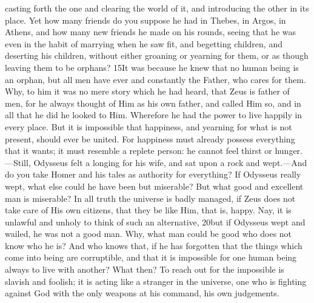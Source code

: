 casting forth the one and clearing the world of it, and introducing the other in its place. Yet how many friends do you suppose he had in Thebes, in Argos, in Athens, and how many new friends he made on his rounds, seeing that he was even in the habit of marrying when he saw fit, and begetting children, and deserting his children, without either groaning or yearning for them, or as though leaving them to be orphans? 15It was because he knew that no human being is an orphan, but all men have ever and constantly the Father, who cares for them. Why, to him it was no mere story which he had heard, that Zeus is father of men, for he always thought of Him as his own father, and called Him so, and in all that he did he looked to Him. Wherefore he had the power to live happily in every place. But it is impossible that happiness, and yearning for what is not present, should ever be united. For happiness must already possess everything that it wants; it must resemble a replete person: he cannot feel thirst or hunger.—Still, Odysseus felt a longing for his wife, and sat upon a rock and wept.—And do you take Homer and his tales as authority for everything? If Odysseus really wept, what else could he have been but miserable? But what good and excellent man is miserable? In all truth the universe is badly managed, if Zeus does not take care of His own citizens, that they be like Him, that is, happy. Nay, it is unlawful and unholy to think of such an alternative, 20but if Odysseus wept and wailed, he was not a good man. Why, what man could be good who does not know who he is? And who knows that, if he has forgotten that the things which come into being are corruptible, and that it is impossible for one human being always to live with another? What then? To reach out for the impossible is slavish and foolish; it is acting like a stranger in the universe, one who is fighting against God with the only weapons at his command, his own judgements.

